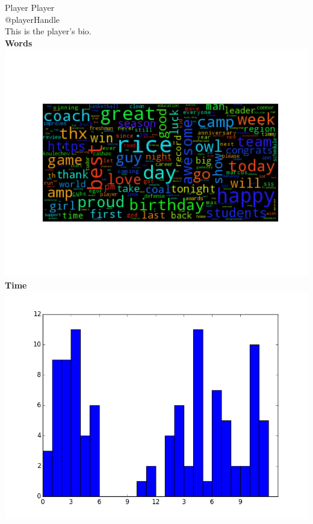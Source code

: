 \documentclass[12pt]{article}
\begin{document}
\huge \noindent Player Player\\
\large @playerHandle\\
\small This is the player's bio.\\
\huge \textbf{Words}\\
\includegraphics[scale=.4, trim={0, 0, 0, 0}]{wordcloud.png}\\
\huge \textbf{Time}\\
\includegraphics[scale=.4, trim={0, 0, 0, 0}]{byTime.png}
\end{document}
